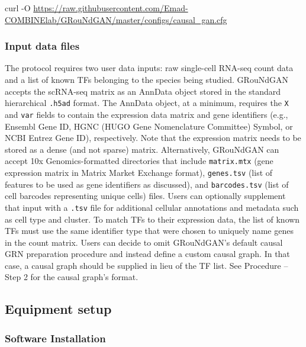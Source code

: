 \begin{codeblock}
curl -O \url{https://raw.githubusercontent.com/Emad-COMBINElab/GRouNdGAN/master/configs/causal_gan.cfg}
\end{codeblock}

\subsubsection*{Input data files}

The protocol requires two user data inputs: raw single-cell RNA-seq count data and a list of known
TFs belonging to the species being studied. GRouNdGAN accepts the scRNA-seq matrix as an
AnnData object stored in the standard hierarchical \texttt{.h5ad} format. The AnnData object, at a
minimum, requires the \texttt{X} and \texttt{var} fields to contain the expression data matrix and gene
identifiers (e.g., Ensembl Gene ID, HGNC (HUGO Gene Nomenclature Committee) Symbol, or
NCBI Entrez Gene ID), respectively. Note that the expression matrix needs to be stored as a dense
(and not sparse) matrix. Alternatively, GRouNdGAN can accept 10x Genomics-formatted
directories that include \texttt{matrix.mtx} (gene expression matrix in Matrix Market Exchange
format), \texttt{genes.tsv} (list of features to be used as gene identifiers as discussed), and
\texttt{barcodes.tsv} (list of cell barcodes representing unique cells) files. Users can optionally
supplement that input with a \texttt{.tsv} file for additional cellular annotations and metadata such as
cell type and cluster. To match TFs to their expression data, the list of known TFs must use the
same identifier type that were chosen to uniquely name genes in the count matrix. Users can
decide to omit GRouNdGAN’s default causal GRN preparation procedure and instead define a
custom causal graph. In that case, a causal graph should be supplied in lieu of the TF list. See
Procedure – Step 2 for the causal graph’s format.

\subsection*{Equipment setup}

\subsubsection*{Software Installation}

